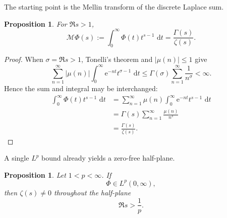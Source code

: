 \documentclass[11pt]{article}
\newtheorem{proposition}[theorem]{Proposition}
\theoremstyle{remark}
\newcommand{\e}{\mathrm e}
\newcommand{\dd}{\,\mathrm d}
\newcommand{\Mellin}{\mathscr M}
\begin{document}
The starting point is the Mellin transform of the discrete Laplace sum.

\begin{proposition}\label{prop:Mellin}
For \(\Re s>1\),
\begin{equation}\label{eq:Mellin-identity}
 \Mellin\Phi(s)
 :=
 \int_0^\infty \Phi(t)t^{s-1}\,\dd t
 =
 \frac{\Gamma(s)}{\zeta(s)}.
\end{equation}
\end{proposition}

\begin{proof}
When \(\sigma=\Re s>1\), Tonelli's theorem and
\(|\mu(n)|\leq1\) give
\[
 \sum_{n=1}^{\infty}|\mu(n)|
 \int_0^\infty \e^{-nt}t^{\sigma-1}\,\dd t
 \leq
 \Gamma(\sigma)\sum_{n=1}^{\infty}\frac1{n^\sigma}
 <\infty.
\]
Hence the sum and integral may be interchanged:
\[
 \begin{aligned}
 \int_0^\infty \Phi(t)t^{s-1}\,\dd t
 &=
 \sum_{n=1}^{\infty}\mu(n)
 \int_0^\infty \e^{-nt}t^{s-1}\,\dd t\\
 &=
 \Gamma(s)\sum_{n=1}^{\infty}\frac{\mu(n)}{n^s}\\
 &=
 \frac{\Gamma(s)}{\zeta(s)}.
 \end{aligned}
\]
\end{proof}

A single \(L^p\) bound already yields a zero-free half-plane.

\begin{proposition}\label{prop:Lp-zero-free}
Let \(1<p<\infty\).  If
\[
 \Phi\in L^p(0,\infty),
\]
then \(\zeta(s)\neq0\) throughout the half-plane
\[
 \Re s>\frac1p.
\]
\end{proposition}
\end{document}
